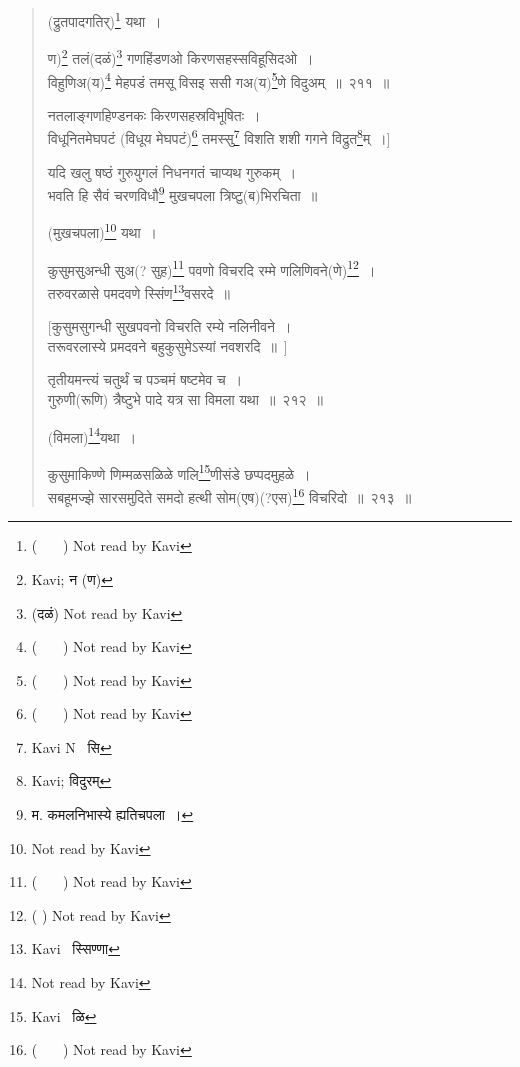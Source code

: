 \documentclass[11pt, openany]{book}
\begin{document}
\newpage
\begin{quote}
(द्रुतपादगतिर्)\renewcommand{\thefootnote}{1}\footnote{( \textendash\ \textendash\ \textendash\ ) Not read by Kavi} यथा~। 

{\na ण)\renewcommand{\thefootnote}{2}\footnote{Kavi; न (ण)} तलं(दळं)\renewcommand{\thefootnote}{3}\footnote{(दळं) Not read by Kavi} गणहिंडणओ किरणसहस्सविहूसिदओ~।\\
विहुणिअ(य)\renewcommand{\thefootnote}{4}\footnote{( \textendash\ \textendash\ \textendash\ ) Not read by Kavi} मेहपडं तमसू विसइ ससी गअ(य)\renewcommand{\thefootnote}{5}\footnote{( \textendash\ \textendash\ \textendash\ ) Not read by Kavi}णे विदुअम्~॥~२११~॥}

{\qt नतलाङ्गणहिण्डनकः किरणसहस्रविभूषितः~।\\
 विधूनितमेघपटं (विधूय मेघपटं)\renewcommand{\thefootnote}{6}\footnote{( \textendash\ \textendash\ \textendash\ ) Not read by Kavi} तमस्सु\renewcommand{\thefootnote}{7}\footnote{Kavi N \textendash\ सि} विशति शशी गगने विद्रुत\renewcommand{\thefootnote}{8}\footnote{Kavi; विदुरम्}म्~।] 

यदि खलु षष्ठं गुरुयुगलं निधनगतं चाप्यथ गुरुकम्~। \\
भवति हि सैवं चरणविधौ\renewcommand{\thefootnote}{*}\footnote{म. कमलनिभास्ये ह्यतिचपला~।} मुखचपला त्रिष्टु(ब)भिरचिता~॥}

(मुखचपला)\renewcommand{\thefootnote}{9}\footnote{Not read by Kavi} यथा~।

{\qt कुसुमसुअन्धी सुअ(? सुह)\renewcommand{\thefootnote}{10}\footnote{( \textendash\ \textendash\ \textendash\ ) Not read by Kavi} पवणो विचरदि रम्मे णलिणिवने(णे)\renewcommand{\thefootnote}{11}\footnote{( \textendash \textendash \textendash ) Not read by Kavi}~।\\
तरुवरळासे पमदवणे स्सिंण\renewcommand{\thefootnote}{12}\footnote{Kavi \textendash\ स्सिण्णा}वसरदे~॥

[कुसुमसुगन्धी सुखपवनो विचरति रम्ये नलिनीवने~। \\
तरूवरलास्ये प्रमदवने बहुकुसुमेऽस्यां नवशरदि~॥~] }

{\na तृतीयमन्त्यं चतुर्थं च पञ्चमं षष्टमेव च~। \\
गुरुणी(रूणि) त्रैष्टुभे पादे यत्र सा विमला यथा~॥~२१२~॥}

(विमला)\renewcommand{\thefootnote}{13}\footnote{Not read by Kavi}यथा~। 

{\na कुसुमाकिण्णे णिम्मळसळिळे णलि\renewcommand{\thefootnote}{14}\footnote{Kavi \textendash\ ळि}णीसंडे छप्पदमुहळे~। \\
सबहूमज्झे सारसमुदिते समदो हत्थी सोम(एष)(?एस)\renewcommand{\thefootnote}{15}\footnote{( \textendash\ \textendash\ \textendash\ ) Not read by Kavi} विचरिदो~॥~२१३~॥}


\end{quote}
\end{document}
